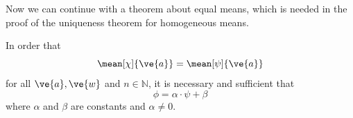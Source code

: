 Now we can continue with a theorem about equal means, which is needed in the proof of the uniqueness theorem for homogeneous means.

\begin{thm} \label{thm-quasi-mean-equal-cond}
	In order that
  \begin{equation} \label{thm-quasi-mean-eq-equal}
    \mean[\chi]{\ve{a}}  = \mean[\psi]{\ve{a}}
  \end{equation}
	for all $\ve{a}, \ve{w}$ and $n \in \mathbb{N}$, it is necessary and sufficient that
  \begin{equation} \label{thm-quasi-mean-eq-linear}
		\phi = \alpha \cdot  \psi + \beta  \end{equation}
	where $\alpha$ and $\beta$ are constants and $\alpha \neq 0$.
\end{thm}

